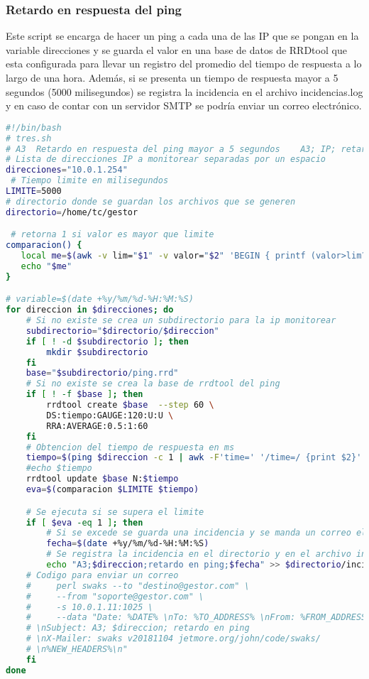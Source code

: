 \documentclass[a4paper,12pt]{article}
\begin{document}
\subsubsection{Retardo en respuesta del ping}
Este script se encarga de hacer un ping a cada una de las IP que se pongan en la variable direcciones y se guarda el valor en una base de datos de RRDtool que esta configurada para llevar un registro del promedio del tiempo de respuesta a lo largo de una hora. Además, si se presenta un tiempo de respuesta mayor a 5 segundos (5000 milisegundos) se registra la incidencia en el archivo incidencias.log y en caso de contar con un servidor SMTP se podría enviar un correo electrónico.

\begin{lstlisting}[language=bash]
 #!/bin/bash
# tres.sh
# A3  Retardo en respuesta del ping mayor a 5 segundos    A3; IP; retardo en ping
# Lista de direcciones IP a monitorear separadas por un espacio
direcciones="10.0.1.254"
 # Tiempo limite en milisegundos
LIMITE=5000
# directorio donde se guardan los archivos que se generen
directorio=/home/tc/gestor

 # retorna 1 si valor es mayor que limite
comparacion() {
   local me=$(awk -v lim="$1" -v valor="$2" 'BEGIN { printf (valor>lim?1:0) }')
   echo "$me"
}

# variable=$(date +%y/%m/%d-%H:%M:%S)
for direccion in $direcciones; do
    # Si no existe se crea un subdirectorio para la ip monitorear
    subdirectorio="$directorio/$direccion"
    if [ ! -d $subdirectorio ]; then
        mkdir $subdirectorio
    fi
    base="$subdirectorio/ping.rrd"
    # Si no existe se crea la base de rrdtool del ping
    if [ ! -f $base ]; then
        rrdtool create $base  --step 60 \
        DS:tiempo:GAUGE:120:U:U \
        RRA:AVERAGE:0.5:1:60
    fi
    # Obtencion del tiempo de respuesta en ms
    tiempo=$(ping $direccion -c 1 | awk -F'time=' '/time=/ {print $2}' | awk -F' ' '{print $1}')
    #echo $tiempo
    rrdtool update $base N:$tiempo
    eva=$(comparacion $LIMITE $tiempo)

    # Se ejecuta si se supera el limite
    if [ $eva -eq 1 ]; then
        # Si se excede se guarda una incidencia y se manda un correo electronico
        fecha=$(date +%y/%m/%d-%H:%M:%S)
        # Se registra la incidencia en el directorio y en el archivo incidencias
        echo "A3;$direccion;retardo en ping;$fecha" >> $directorio/incidencias.log
    # Codigo para enviar un correo
    #     perl swaks --to "destino@gestor.com" \
    #     --from "soporte@gestor.com" \
    #     -s 10.0.1.11:1025 \
    #     --data "Date: %DATE% \nTo: %TO_ADDRESS% \nFrom: %FROM_ADDRESS% 
    # \nSubject: A3; $direccion; retardo en ping 
    # \nX-Mailer: swaks v20181104 jetmore.org/john/code/swaks/
    # \n%NEW_HEADERS%\n"
    fi
done

\end{lstlisting}
\end{document}

